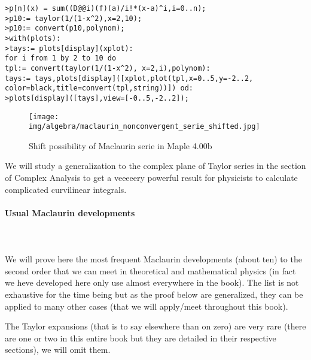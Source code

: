 	\texttt{>p[n](x) = sum((D@@i)(f)(a)/i!*(x-a)\string^i,i=0..n);\\
	>p10:= taylor(1/(1-x\string^2),x=2,10);\\
	>p10:= convert(p10,polynom);\\
	>with(plots):\\
	>tays:= plots[display](xplot):\\
	for i from 1 by 2 to 10 do\\
	tpl:= convert(taylor(1/(1-x\string^2), x=2,i),polynom):\\
	tays:= tays,plots[display]([xplot,plot(tpl,x=0..5,y=-2..2,\\
	color=black,title=convert(tpl,string))]) od: \\
	>plots[display]([tays],view=[-0..5,-2..2]);}
	
	\begin{figure}[H]
		\centering
		\texttt{[image: img/algebra/maclaurin\_nonconvergent\_serie\_shifted.jpg]}
		\caption{Shift possibility of Maclaurin serie in Maple 4.00b}
	\end{figure}
	
	We will study a generalization to the complex plane of Taylor series in the section of Complex Analysis to get a veeeeery powerful result for physicists to calculate complicated curvilinear integrals.
	
	\pagebreak
	\paragraph{Usual Maclaurin developments}\label{usual maclaurin developments}\mbox{}\\\\
	We will prove here the most frequent Maclaurin developments (about ten) to the second order that we can meet in theoretical and mathematical physics (in fact we heve developed here only use almost everywhere in the book). The list is not exhaustive for the time being but as the proof below are generalized, they can be applied to many other cases (that we will apply/meet throughout this book).
	
	\begin{tcolorbox}[title=Remark,colframe=black,arc=10pt]
	The Taylor expansions (that is to say elsewhere than on zero) are very rare (there are one or two in this entire book but they are detailed in their respective sections), we will omit them.
	\end{tcolorbox}
	
